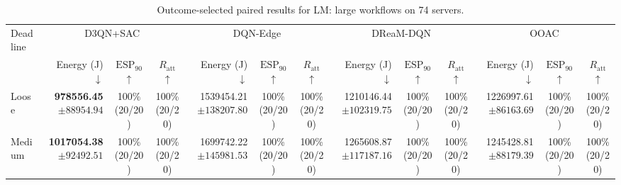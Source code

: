 \begin{table}[!t]
\centering
\caption{Outcome-selected paired results for LM: large workflows on 74 servers.}
\label{tab:conditional_case_lm}
\begingroup
\footnotesize
\setlength{\tabcolsep}{2.2pt}
\renewcommand{\arraystretch}{1.08}
\begin{tabular}{@{}l*{4}{rcc}@{}}
\toprule
Deadline & \multicolumn{3}{c}{D3QN+SAC} & \multicolumn{3}{c}{DQN-Edge} & \multicolumn{3}{c}{DReaM-DQN} & \multicolumn{3}{c}{OOAC} \\
\cmidrule(lr){2-4}\cmidrule(lr){5-7}\cmidrule(lr){8-10}\cmidrule(lr){11-13}
 & Energy (J) $\downarrow$ & $\mathrm{ESP}_{90}$ $\uparrow$ & $R_{\mathrm{att}}$ $\uparrow$ & Energy (J) $\downarrow$ & $\mathrm{ESP}_{90}$ $\uparrow$ & $R_{\mathrm{att}}$ $\uparrow$ & Energy (J) $\downarrow$ & $\mathrm{ESP}_{90}$ $\uparrow$ & $R_{\mathrm{att}}$ $\uparrow$ & Energy (J) $\downarrow$ & $\mathrm{ESP}_{90}$ $\uparrow$ & $R_{\mathrm{att}}$ $\uparrow$ \\
\midrule
Loose & \shortstack[r]{\textbf{978556.45}\\$\pm 88954.94$} & \shortstack[c]{100\%\\(20/20)} & \shortstack[c]{100\%\\(20/20)} & \shortstack[r]{1539454.21\\$\pm 138207.80$} & \shortstack[c]{100\%\\(20/20)} & \shortstack[c]{100\%\\(20/20)} & \shortstack[r]{1210146.44\\$\pm 102319.75$} & \shortstack[c]{100\%\\(20/20)} & \shortstack[c]{100\%\\(20/20)} & \shortstack[r]{1226997.61\\$\pm 86163.69$} & \shortstack[c]{100\%\\(20/20)} & \shortstack[c]{100\%\\(20/20)} \\
Medium & \shortstack[r]{\textbf{1017054.38}\\$\pm 92492.51$} & \shortstack[c]{100\%\\(20/20)} & \shortstack[c]{100\%\\(20/20)} & \shortstack[r]{1699742.22\\$\pm 145981.53$} & \shortstack[c]{100\%\\(20/20)} & \shortstack[c]{100\%\\(20/20)} & \shortstack[r]{1265608.87\\$\pm 117187.16$} & \shortstack[c]{100\%\\(20/20)} & \shortstack[c]{100\%\\(20/20)} & \shortstack[r]{1245428.81\\$\pm 88179.39$} & \shortstack[c]{100\%\\(20/20)} & \shortstack[c]{100\%\\(20/20)} \\

\end{tabular}
\end{table}
